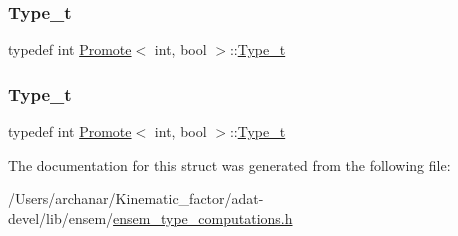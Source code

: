 \subsubsection{\texorpdfstring{Type\_t}{Type\_t}\hspace{0.1cm}{\footnotesize\ttfamily [2/3]}}
{\footnotesize\ttfamily typedef int \mbox{\hyperlink{structPromote}{Promote}}$<$ int, bool $>$\+::\mbox{\hyperlink{structPromote_3_01int_00_01bool_01_4_ac7c77d48ab422ab631e128719c53a30b}{Type\+\_\+t}}}

\mbox{\label{structPromote_3_01int_00_01bool_01_4_ac7c77d48ab422ab631e128719c53a30b}} 
\subsubsection{\texorpdfstring{Type\_t}{Type\_t}\hspace{0.1cm}{\footnotesize\ttfamily [3/3]}}
{\footnotesize\ttfamily typedef int \mbox{\hyperlink{structPromote}{Promote}}$<$ int, bool $>$\+::\mbox{\hyperlink{structPromote_3_01int_00_01bool_01_4_ac7c77d48ab422ab631e128719c53a30b}{Type\+\_\+t}}}



The documentation for this struct was generated from the following file\+:\begin{DoxyCompactItemize}
\item 
/\+Users/archanar/\+Kinematic\+\_\+factor/adat-\/devel/lib/ensem/\mbox{\hyperlink{adat-devel_2lib_2ensem_2ensem__type__computations_8h}{ensem\+\_\+type\+\_\+computations.\+h}}\end{DoxyCompactItemize}
